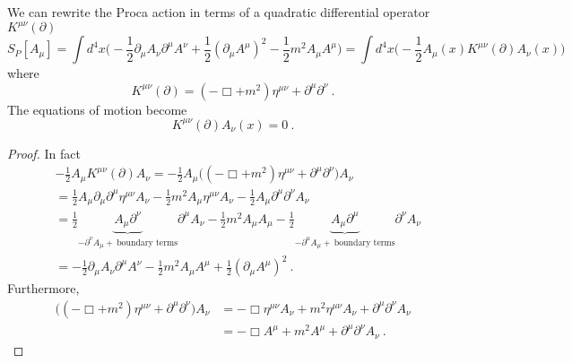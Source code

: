     We can rewrite the Proca action in terms of a quadratic differential operator $K^{\mu\nu} (\partial)$
    \begin{equation*}
        S_P[A_\mu] =  \int d^4 x \Big ( -\frac{1}{2} \partial_\mu A_\nu \partial^\mu A^\nu + \frac{1}{2} (\partial_\mu A^\mu)^2 - \frac{1}{2} m^2 A_\mu A^\mu \Big) = \int d^4 x \Big ( - \frac{1}{2} A_\mu (x) K^{\mu\nu} (\partial) A_\nu (x) \Big)
    \end{equation*}
    where 
    \begin{equation*}
        K^{\mu\nu} (\partial) = (- \Box + m^2) \eta^{\mu\nu} + \partial^\mu \partial^\nu ~.
    \end{equation*}
    The equations of motion become
    \begin{equation*}
        K^{\mu\nu} (\partial) A_\nu (x) = 0~.
    \end{equation*}
    \begin{proof}
        In fact 
        \begin{equation*}
        \begin{aligned}
            & - \frac{1}{2} A_\mu K^{\mu\nu} (\partial) A_\nu =  - \frac{1}{2} A_\mu \Big ( (- \Box + m^2) \eta^{\mu\nu} + \partial^\mu \partial^\nu \Big ) A_\nu \\ & = \frac{1}{2} A_\mu \partial_\mu \partial^\mu \eta^{\mu\nu} A_\nu - \frac{1}{2} m^2 A_\mu \eta^{\mu\nu} A_\nu - \frac{1}{2} A_\mu \partial^\mu \partial^\nu A_\nu \\ & = \frac{1}{2} \underbrace{A_\mu \partial^\nu}_{- \partial^\nu A_\mu + ~ \text{boundary terms}} \partial^\mu A_\nu - \frac{1}{2} m^2 A_\mu A_\mu - \frac{1}{2} \underbrace{A_\mu \partial^\mu}_{- \partial^\mu A_\mu + ~ \text{boundary terms}} \partial^\nu A_\nu \\ & = - \frac{1}{2} \partial_\mu A_\nu \partial^\mu A^\nu - \frac{1}{2} m^2 A_\mu A^\mu + \frac{1}{2} (\partial_\mu A^\mu)^2 ~.
        \end{aligned}
        \end{equation*}
        Furthermore, 
        \begin{equation*}
        \begin{aligned}
            \Big ((- \Box + m^2) \eta^{\mu\nu} + \partial^\mu \partial^\nu \Big ) A_\nu & = - \Box \eta^{\mu\nu} A_\nu + m^2 \eta^{\mu\nu} A_\nu + \partial^\mu \partial^\nu A_\nu \\ & = - \Box A^\mu + m^2 A^\mu + \partial^\mu \partial^\nu A_\nu ~.
        \end{aligned}
        \end{equation*}
    \end{proof}

